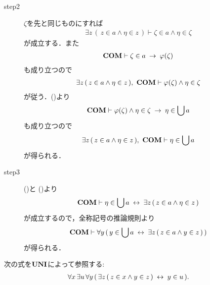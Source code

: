 \begin{sketch}
\begin{description}
			\item[step2]
				$\zeta$を先と同じものにすれば
				\begin{align}
					\exists z\, (\, z \in a \wedge \eta \in z\, )
					\vdash \zeta \in a \wedge \eta \in \zeta
				\end{align}
				が成立する．また
				\begin{align}
					\mbox{\bf COM} \vdash \zeta \in a \hspace{0.25em}\rightarrow\hspace{0.25em} \varphi(\zeta)
				\end{align}
				も成り立つので
				\begin{align}
					\exists z\, (\, z \in a \wedge \eta \in z\, ),\ \COMAX
					\vdash \varphi(\zeta) \wedge \eta \in \zeta
				\end{align}
				が従う．()より
				\begin{align}
					\mbox{\bf COM} \vdash \varphi(\zeta) \wedge \eta \in \zeta
					\hspace{0.25em}\rightarrow\hspace{0.25em} \eta \in \bigcup a
				\end{align}
				も成り立つので
				\begin{align}
					\exists z\, (\, z \in a \wedge \eta \in z\, ),\ \COMAX \vdash 
					\eta \in \bigcup a
					\label{fom:comprehension_of_unions_3}
				\end{align}
				が得られる．
			
			\item[step3]
				()と
				()より
				\begin{align}
					\mbox{\bf COM} \vdash \eta \in \bigcup a 
					\hspace{0.25em}\leftrightarrow\hspace{0.25em} \exists z\, (\, z \in a \wedge \eta \in z\, )
				\end{align}
				が成立するので，全称記号の推論規則より
				\begin{align}
					\mbox{\bf COM} \vdash \forall y\, (\, y \in \bigcup a 
					\hspace{0.25em}\leftrightarrow\hspace{0.25em} \exists z\, (\, z \in a \wedge y \in z\, )\, )
				\end{align}
				が得られる．
				\QED
		\end{description}
	\end{sketch}
	
	\begin{screen}
		\begin{axm}[合併の公理]
			次の式を$\mbox{{\bf UNI}}$によって参照する:
			\begin{align}
				\forall x\, \exists u\, \forall y\, (\, \exists z\, (\, z \in x \wedge y \in z\, ) \hspace{0.25em}\leftrightarrow\hspace{0.25em} y \in u\, ).
			\end{align}
		\end{axm}
	\end{screen}
	
